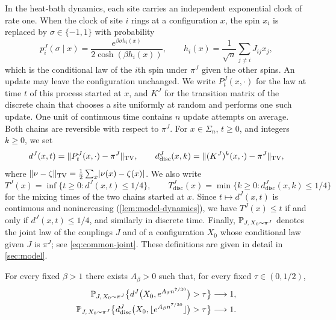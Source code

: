 In the heat-bath dynamics, each site carries an independent exponential
clock of rate one. When the clock of site $i$ rings at a configuration $x$,
the spin $x_i$ is replaced by $\sigma\in\{-1,1\}$ with probability
\[
 p_i^J(\sigma\mid x)=\frac{e^{\beta\sigma h_i(x)}}{2\cosh(\beta h_i(x))},\qquad
 h_i(x)=\frac1{\sqrt n}\sum_{j\ne i}J_{ij}x_j,
\]
which is the conditional law of the $i$th spin under $\pi^J$ given the
other spins. An update may leave the configuration unchanged. We write
$P_t^J(x,\cdot)$ for the law at time $t$ of this process started at $x$, and
$K^J$ for the transition matrix of the discrete chain that chooses a site
uniformly at random and performs one such update. One unit of continuous
time contains $n$ update attempts on average. Both chains are reversible with
respect to $\pi^J$. For $x\in\Sigma_n$, $t\ge0$, and integers $k\ge0$, we
set
\[
 d^J(x,t)=\lVert P_t^J(x,\cdot)-\pi^J\rVert_{\mathrm{TV}},\qquad
 d^J_{\mathrm{disc}}(x,k)=\lVert (K^J)^k(x,\cdot)-\pi^J\rVert_{\mathrm{TV}},
\]
where $\lVert \nu-\zeta\rVert_{\mathrm{TV}}=\frac12\sum_x\lvert \nu(x)-\zeta(x)\rvert$. We also
write
\[
 T^J(x)=\inf\{t\ge0:d^J(x,t)\le1/4\},\qquad
 T^J_{\mathrm{disc}}(x)=\min\{k\ge0:d^J_{\mathrm{disc}}(x,k)\le1/4\}
\]
for the mixing times of the two chains started at $x$. Since
$t\mapsto d^J(x,t)$ is continuous and nonincreasing
(\cref{lem:model-dynamics}), we have $T^J(x)\le t$ if and only if
$d^J(x,t)\le1/4$, and similarly in discrete time. Finally,
$\mathbb P_{J,\,X_0\sim\pi^J}$ denotes the joint law of the couplings $J$ and of a
configuration $X_0$ whose conditional law given $J$ is $\pi^J$; see
\eqref{eq:common-joint}. These definitions are given in detail in
\cref{sec:model}.

\begin{theorem}\label{thm:barrier-730}
For every fixed $\beta>1$ there exists $A_\beta>0$ such that, for every
fixed $\tau\in(0,1/2)$,
\begin{align}
 \mathbb P_{J,\,X_0\sim\pi^J}
   \bigl\{d^J\bigl(X_0,e^{A_\beta n^{7/30}}\bigr)>\tau\bigr\}
   &\longrightarrow1,\label{eq:barrier-730-continuous}\\
 \mathbb P_{J,\,X_0\sim\pi^J}
   \bigl\{d^J_{\mathrm{disc}}\bigl(X_0,\lfloor e^{A_\beta n^{7/30}}\rfloor\bigr)>\tau\bigr\}
   &\longrightarrow1.\label{eq:barrier-730-discrete}
\end{align}
\end{theorem}

